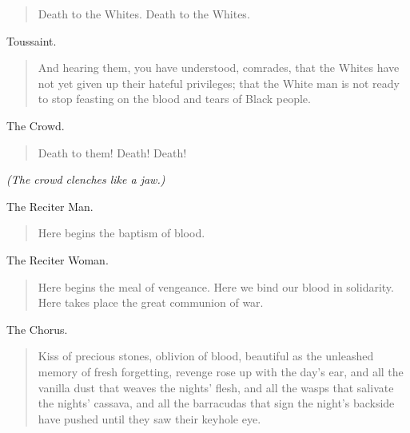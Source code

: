 \documentclass[letterpaper,article,12pt,oneside,notitlepage]{memoir}
\begin{document}
\begin{verse}
\hspace{1cm} Death to the Whites. Death to the Whites. \\
\end{verse}

\clearpage

\begin{center}Toussaint.\end{center}

\begin{verse}
\indent And hearing them, you have understood, comrades, that the Whites have not yet given up their hateful privileges; that the White man is not ready to stop feasting on the blood and tears of Black people. \\
\end{verse}

\begin{center}The Crowd.\end{center}

\begin{verse}
\hspace{1cm} Death to them! Death! Death! \\
\end{verse}

\textit{(The crowd clenches like a jaw.)}

\begin{center}The Reciter Man.\end{center}

\begin{verse}
\hspace{1cm} Here begins the baptism of blood. \\
\end{verse}

\begin{center}The Reciter Woman.\end{center}

\begin{verse}
\indent Here begins the meal of vengeance. Here we bind our blood in solidarity. Here takes place the great communion of war. \\
\end{verse}

\begin{center}The Chorus.\end{center}

\begin{verse}
Kiss of precious stones, oblivion of blood, beautiful as the unleashed memory of fresh forgetting, revenge rose up with the day's ear, and all the vanilla dust that weaves the nights' flesh, and all the wasps that salivate the nights' cassava, and all the barracudas that sign the night's backside have pushed until they saw their keyhole eye. \\
\end{verse}
\end{document}

